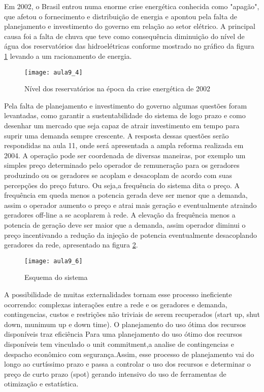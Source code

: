  Em 2002, o Brasil entrou numa enorme crise energética conhecida como "apagão", que afetou o fornecimento e distribuição de energia e apontou pela falta de planejamento e investimento do governo em relação ao setor elétrico. A principal causa foi a falta de chuva que teve como consequência diminuição do nível de água dos reservatórios das hidroelétricas conforme mostrado no gráfico da figura \ref{fig:aula9-4}  levando a um racionamento de energia.
 
\begin{figure}[H]
\begin{centering}
\texttt{[image: aula9\_4]}\protect\caption{\label{fig:aula9-4} Nível dos reservatórios na época da crise energética de 2002 }
\end{centering}
\end{figure}

 Pela falta de planejamento e investimento do governo algumas questões foram levantadas, como garantir a sustentabilidade do sistema de logo prazo e como desenhar um mercado que seja capaz de atrair investimento em tempo para suprir uma demanda sempre crescente. A resposta dessas questões serão respondidas na aula 11, onde será apresentada a ampla reforma realizada em 2004.
  A operação pode ser coordenada de diversas maneiras, por exemplo um simples preço determinado pelo operador de remuneração para os geradores produzindo ou os geradores se acoplam e desacoplam de acordo com suas percepções do preço futuro. Ou seja,a frequência do sistema dita o preço. A frequência em queda menos a potencia gerada deve ser menor que a demanda, assim o operador aumento o preço e atrai mais geração e eventualmente atraindo
geradores off-line a se acoplarem à rede. A elevação da frequência menos a potencia de geração deve ser maior que a demanda, assim operador diminui o preço incentivando a redução da injeção de potencia eventualmente desacoplando geradores da rede, apresentado na figura \ref{fig:aula9-6}.

\begin{figure}[H]
\begin{centering}
\texttt{[image: aula9\_6]}\protect\caption{\label{fig:aula9-6} Esquema do sistema }
\end{centering}
\end{figure}

 A possibilidade de muitas externalidades tornam esse processo ineficiente ocorrendo: complexas interações entre a rede e os geradores e demanda, contingencias, custos e restrições não triviais de serem recuperados (start up, shut down, munimum up e down time).
O planejamento do uso ótima dos recursos disponíveis traz eficiência
Para uma planejamento do uso ótimo dos recursos disponíveis tem vinculado o unit commitment,a analise de contingencias e despacho econômico com segurança.Assim, esse processo de planejamento vai do longo ao curtíssimo prazo e passa a controlar o uso dos recursos e determinar o preço de curto prazo (spot) gerando intensivo do uso de ferramentas de otimização e estatística.

